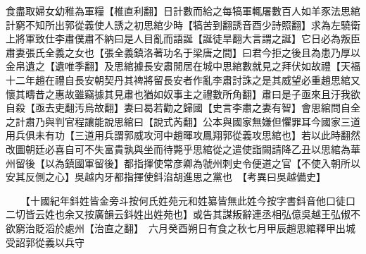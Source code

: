 食盡取婦女幼稚為軍糧【椎直利翻】日計數而給之每犒軍輒屠數百人如羊豕法思綰計窮不知所出郭從義使人誘之初思綰少時【犒苦到翻誘音酉少詩照翻】求為左驍衛上將軍致仕李肅僕肅不納曰是人目亂而語誕【誕徒旱翻大言謂之誕】它日必為叛臣肅妻張氏全義之女也【張全義鎮洛著功名于梁唐之間】曰君今拒之後且為患乃厚以金帛遺之【遺唯季翻】及思綰據長安肅閒居在城中思綰數就見之拜伏如故禮【天福十二年趙在禮自長安朝契丹其禆將留長安者作亂李肅討誅之是其威望必重趙思綰又懷其疇昔之惠故雖竊據其見肅也猶如奴事主之禮數所角翻】肅曰是子亟來且汙我欲自殺【亟去吏翻汚烏故翻】妻曰曷若勸之歸國【史言李肅之妻有智】會思綰問自全之計肅乃與判官程讓能說思綰曰【說式芮翻】公本與國家無嫌但懼罪耳今國家三道用兵俱未有功【三道用兵謂郭威攻河中趙暉攻鳳翔郭從義攻思綰也】若以此時翻然改圖朝廷必喜自可不失富貴孰與坐而待斃乎思綰從之遣使詣闕請降乙丑以思綰為華州留後【以為鎮國軍留後】都指揮使常彦卿為虢州刺史令便道之官【不使入朝所以安其反側之心】吳越内牙都指揮使鈄淊胡進思之黨也　【考異曰吳越備史】

　　【十國紀年鈄姓皆金旁斗按何氏姓苑元和姓纂皆無此姓今按字書鈄音他口徒口二切皆云姓也余又按廣韻云鈄姓出姓苑也】或告其謀叛辭連丞相弘億吳越王弘俶不欲窮治貶滔於處州【治直之翻】　六月癸酉朔日有食之秋七月甲辰趙思綰釋甲出城受詔郭從義以兵守

